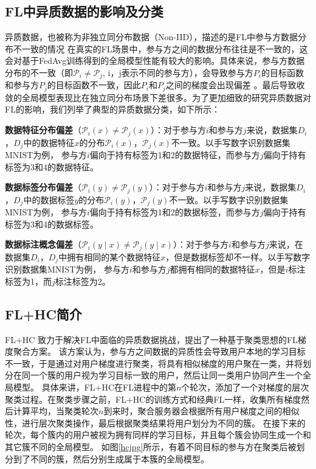 \subsection{FL中异质数据的影响及分类}
异质数据，也被称为非独立同分布数据（Non-IID），描述的是FL中参与方数据分布不一致的情况
在真实的FL场景中，参与方之间的数据分布往往是不一致的，这会对基于FedAvg训练得到的全局模型性能有较大的影响。具体来说，参与方数据分布的不一致（即$\mathcal{P}_i \neq \mathcal{P}_j$, i，j表示不同的参与方），会导致参与方$P_i$的目标函数和参与方$P_j$的目标函数不一致，因此$P_i$和$P_j$之间的梯度会出现偏差 \cite{kaissis2020secure}。最后导致收敛的全局模型表现比在独立同分布场景下差很多。为了更加细致的研究异质数据对FL的影响，我们列举了典型的异质数据分类，如下所示：
\begin{compactitem}
    \item \textbf{数据特征分布偏差}（$\mathcal{P}_i(x) \neq \mathcal{P}_j(x)$）：对于参与方$i$和参与方$j$来说，数据集$D_i$，$D_j$中的数据特征$x$的分布$\mathcal{P}_i(x)$，$\mathcal{P}_j(x)$不一致。以手写数字识别数据集MNIST为例， 参与方$i$偏向于持有标签为1和2的数据特征，而参与方$j$偏向于持有标签为3和4的数据特征。
    \item \textbf{数据标签分布偏差}（$\mathcal{P}_i(y) \neq \mathcal{P}_j(y)$）：对于参与方$i$和参与方$j$来说，数据集$D_i$，$D_j$中的数据标签$y$的分布$\mathcal{P}_i(y)$，$\mathcal{P}_j(y)$不一致。以手写数字识别数据集MNIST为例， 参与方$i$偏向于持有标签为1和2的数据标签，而参与方$j$偏向于持有标签为3和4的数据标签。
    \item \textbf{数据标注概念偏差}（$\mathcal{P}_i(y \mid x) \neq\mathcal{P}_j(y \mid x)$）：对于参与方$i$和参与方$j$来说，在数据集$D_i$，$D_j$中拥有相同的某个数据特征$x$，但是数据标签却不一样。以手写数字识别数据集MNIST为例， 参与方$i$和参与方$j$都拥有相同的数据特征$x$，但是$i$标注标签为1，而$j$标注标签为2。
\end{compactitem}

\subsection{FL+HC简介}
FL+HC \cite{briggs2020federated} 致力于解决FL中面临的异质数据挑战，提出了一种基于聚类思想的FL梯度聚合方案。
该方案认为，参与方之间数据的异质性会导致用户本地的学习目标不一致，于是通过对用户梯度进行聚类，将具有相似梯度的用户聚在一类，并将划分在同一个簇的用户视为学习目标一致的用户，然后让同一类用户协同产生一个全局模型。
具体来讲，FL+HC在FL进程中的第$n$个轮次，添加了一个对梯度的层次聚类过程。在聚类步骤之前，FL+HC的训练方式和经典FL一样，收集所有梯度然后计算平均，当聚类轮次$n$到来时，聚合服务器会根据所有用户梯度之间的相似性，进行层次聚类操作，最后根据聚类结果将用户划分为不同的簇。
在接下来的轮次，每个簇内的用户被视为拥有同样的学习目标，并且每个簇会协同生成一个和其它簇不同的全局模型。
如图\ref{hcjpg}所示，有着不同目标的参与方在聚类后被划分到了不同的簇，然后分别生成属于本簇的全局模型。

